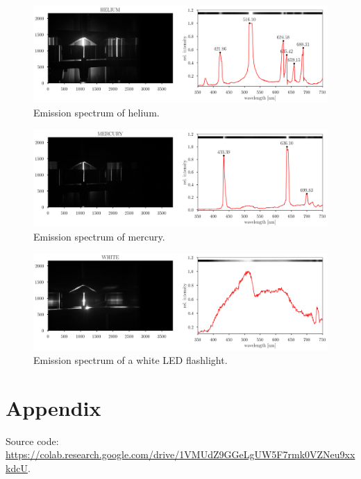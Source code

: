 \documentclass[12pt,a4paper,twoside]{article}
\begin{document}
\begin{figure}[H]
	\centering
	\includegraphics[width=\linewidth]{HELIUM.png}
	\caption{Emission spectrum of helium.}
	\label{fig:helium}
\end{figure}

\begin{figure}[H]
	\centering
	\includegraphics[width=\linewidth]{MERCURY.png}
	\caption{Emission spectrum of mercury.}
	\label{fig:mercury}
\end{figure}

\begin{figure}[H]
	\centering
	\includegraphics[width=\linewidth]{WHITE.png}
	\caption{Emission spectrum of a white LED flashlight.}
	\label{fig:white}
\end{figure}




\section*{Appendix}
Source code: \\
\url{https://colab.research.google.com/drive/1VMUdZ9GGeLgUW5F7rmk0VZNeu9xxkdcU}.

%
%


%
\end{document}
